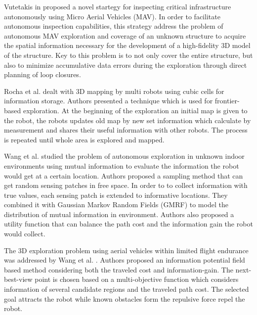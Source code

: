 Vutetakis in \cite{Vutetakis2019} proposed a novel startegy for inspecting
critical infrastructure autonomously using Micro Aerial Vehicles (MAV). In order to facilitate autonomous inspection capabilities, this strategy address the problem of autonomous MAV exploration and coverage of an unknown structure to acquire the spatial information necessary for the development of a high-fidelity 3D model of the structure. Key to this problem is to not only cover the entire structure, but also to minimize accumulative data errors during the exploration through direct planning of loop closures. 

Rocha et al. \cite{Rocha2005} dealt with 3D mapping by multi robots using cubic cells for information storage. Authors presented a technique which is used for frontier-based exploration. At the beginning of the exploration an initial map is given to the robot, the robots updates old map by new set information which calculate by measurement and shares their useful information with other robots. The process is repeated until whole area is explored and mapped.

Wang et al. \cite{Wang2018} studied the problem of autonomous exploration in unknown indoor environments using mutual information to evaluate the information the robot would get at a certain location. Authors proposed a
sampling method that can get random sensing patches in free space. In order to to collect information with true values, each sensing patch is extended to informative locations. They combined it with Gaussian
Markov Random Fields (GMRF) to model the distribution of mutual information in environment.  Authors also proposed a utility function that can balance the path cost and the information gain the robot
would collect.

The 3D exploration problem using aerial vehicles within limited flight endurance was addressed by Wang et al. \cite{Wang2019}. Authors proposed an information potential field based method considering both the traveled cost and information-gain. The next-best-view point is chosen based on a multi-objective function which considers information of several candidate regions and the traveled path cost. The selected goal
attracts the robot while known obstacles form the repulsive
force repel the robot.



